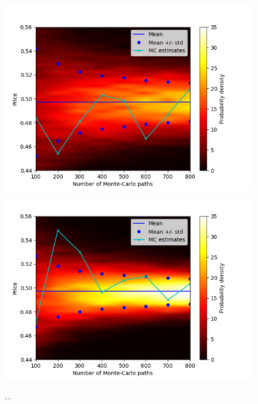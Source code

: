 \begin{figure}
\centering
\includegraphics[scale=0.7]{figures/density_3d_ZCBond_False.png}
\includegraphics[scale=0.7]{figures/density_3d_ZCBond_True.png}
\caption{...}
\end{figure}


